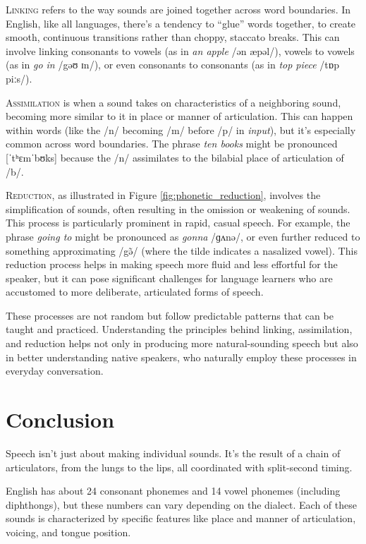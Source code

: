 \textsc{Linking} refers to the way sounds are joined together across word boundaries. In English, like all languages, there's a tendency to ``glue'' words together, to create smooth, continuous transitions rather than choppy, staccato breaks. This can involve linking consonants to vowels (as in \textit{an apple} /ən æpəl/), vowels to vowels (as in \textit{go in} /gəʊ ɪn/), or even consonants to consonants (as in \textit{top piece} /tɒp piːs/).

\textsc{Assimilation} is when a sound takes on characteristics of a neighboring sound, becoming more similar to it in place or manner of articulation. This can happen within words (like the /n/ becoming /m/ before /p/ in \textit{input}), but it's especially common across word boundaries. The phrase \textit{ten books} might be pronounced [ˈtʰɛmˈbʊks] because the /n/ assimilates to the bilabial place of articulation of /b/.

\textsc{Reduction}, as illustrated in Figure \ref{fig:phonetic_reduction}, involves the simplification of sounds, often resulting in the omission or weakening of sounds. This process is particularly prominent in rapid, casual speech. For example, the phrase \textit{going to} might be pronounced as \textit{gonna} /ɡʌnə/, or even further reduced to something approximating /g\~ə/ (where the tilde indicates a nasalized vowel). This reduction process helps in making speech more fluid and less effortful for the speaker, but it can pose significant challenges for language learners who are accustomed to more deliberate, articulated forms of speech.

These processes are not random but follow predictable patterns that can be taught and practiced. Understanding the principles behind linking, assimilation, and reduction helps not only in producing more natural-sounding speech but also in better understanding native speakers, who naturally employ these processes in everyday conversation.

\section{Conclusion}

Speech isn't just about making individual sounds. It's the result of a chain of articulators, from the lungs to the lips, all coordinated with split-second timing.

English has about 24 consonant phonemes and 14 vowel phonemes (including diphthongs), but these numbers can vary depending on the dialect. Each of these sounds is characterized by specific features like place and manner of articulation, voicing, and tongue position.


